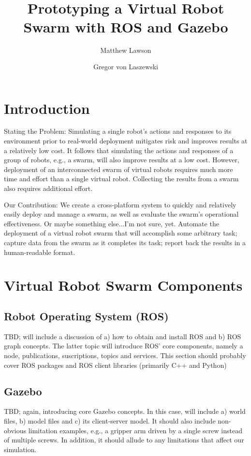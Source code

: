 \documentclass[9pt,twocolumn,twoside]{../../styles/osajnl}
\title{Prototyping a Virtual Robot Swarm with ROS and Gazebo}
\author[1]{Matthew Lawson}
\author[1,*]{Gregor von Laszewski}
\affil[1]{School of Informatics and Computing, Bloomington, IN 47408, U.S.A.}
\affil[*]{Corresponding authors: laszewski@gmail.com}
\begin{document}
\maketitle

\section{Introduction}
Stating the Problem:
Simulating a single robot's actions and responses to its environment prior to real-world deployment mitigates risk and improves results at a relatively low cost. It follows that simulating the actions and responses of a group of robots, e.g., a swarm, will also improve results at a low cost.  However, deployment of an interconnected swarm of virtual robots requires much more time and effort than a single virtual robot.  Collecting the results from a swarm also requires additional effort.

Our Contribution:
We create a cross-platform system to quickly and relatively easily deploy and manage a swarm, as well as evaluate the swarm's operational effectiveness.  Or maybe something else...I'm not sure, yet.
Automate the deployment of a virtual robot swarm that will accomplish some arbitrary task; capture data from the swarm as it completes its task; report back the results in a human-readable format.

\section{Virtual Robot Swarm Components}
\subsection{Robot Operating System (ROS) \cite{www-ros-about}}
TBD; will include a discussion of a) how to obtain and install ROS and b) ROS graph concepts.  The latter topic will introduce ROS' core components, namely a node, publications, suscriptions, topics and services.  This section should probably cover ROS packages and ROS client libraries (primarily C++ and Python)
\subsection{Gazebo \cite{www-software-categories}}
TBD; again, introducing core Gazebo concepts.  In this case, will include a) world files, b) model files and c) its client-server model.  It should also include non-obvious limitation examples, e.g., a gripper arm driven by a single screw instead of multiple screws.  In addition, it should allude to any limitations that affect our simulation.
\end{document}

